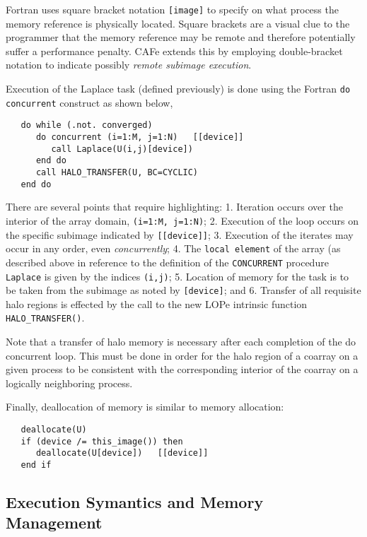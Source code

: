 Fortran uses square bracket notation \texttt{[image]} to specify on what process the
memory reference is physically located.  Square brackets are a visual clue to the
programmer that the memory reference may be remote and therefore potentially suffer a
performance penalty.  CAFe extends this by employing double-bracket notation to indicate
possibly \emph{remote subimage execution}.

Execution of the Laplace task (defined previously) is done using the Fortran \texttt{do
concurrent} construct as shown below,
\begin{verbatim}
   do while (.not. converged)
      do concurrent (i=1:M, j=1:N)   [[device]]
         call Laplace(U(i,j)[device])
      end do
      call HALO_TRANSFER(U, BC=CYCLIC)
   end do
\end{verbatim}
There are several points that require highlighting: 1. Iteration occurs over the interior
of the array domain, \texttt{(i=1:M, j=1:N)}; 2. Execution of the loop occurs on the
specific subimage indicated by \texttt{[[device]]}; 3. Execution of the iterates may occur
in any order, even \emph{concurrently}; 4. The \texttt{local element} of the array (as
described above in reference to the definition of the \texttt{CONCURRENT} procedure
\texttt{Laplace} is given by the indices \texttt{(i,j)}; 5. Location of memory for the
task is to be taken from the subimage as noted by \texttt{[device]}; and 6. Transfer of
all requisite halo regions is effected by the call to the new LOPe intrinsic function
\texttt{HALO\_TRANSFER()}.

Note that a transfer of halo memory is necessary after each completion of the do concurrent loop.
This must be done in order for the halo region of a coarray on a given process to be consistent
with the corresponding interior of the coarray on a logically neighboring process.


Finally, deallocation of memory is similar to memory allocation:
\begin{verbatim}
   deallocate(U)
   if (device /= this_image()) then
      deallocate(U[device])   [[device]]
   end if
\end{verbatim}


\subsection{Execution Symantics and Memory Management}

